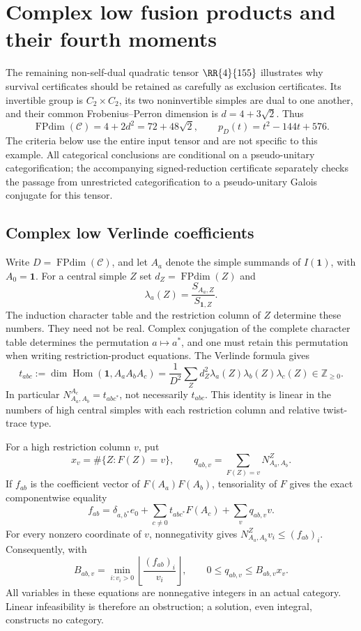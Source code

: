 \section{Complex low fusion products and their fourth moments}
\label{sec:complex-low-fourth}

The remaining non-self-dual quadratic tensor $\RR{4}{155}$ illustrates why
survival certificates should be retained as carefully as exclusion
certificates. Its invertible group is $C_2\times C_2$, its two noninvertible
simples are dual to one another, and their common Frobenius--Perron dimension
is $d=4+3\sqrt2$. Thus
\[
 \operatorname{FPdim}(\mathcal C)=4+2d^2=72+48\sqrt2,
 \qquad p_D(t)=t^2-144t+576.
\]
The criteria below use the entire input tensor and are not specific to this
example. All categorical conclusions are conditional on a pseudo-unitary
categorification; the accompanying signed-reduction certificate separately
checks the passage from unrestricted categorification to a pseudo-unitary
Galois conjugate for this tensor.

\subsection{Complex low Verlinde coefficients}
Write $D=\operatorname{FPdim}(\mathcal C)$, and let $A_a$ denote the simple
summands of $I(\mathbf1)$, with $A_0=\mathbf1$. For a central simple $Z$ set
$d_Z=\operatorname{FPdim}(Z)$ and
\[
 \lambda_a(Z)=\frac{S_{A_a,Z}}{S_{\mathbf1,Z}}.
\]
The induction character table and the restriction column of $Z$ determine
these numbers. They need not be real. Complex conjugation of the complete
character table determines the permutation $a\mapsto a^*$, and one must
retain this permutation when writing restriction-product equations.
The Verlinde formula gives
\begin{equation}\label{eq:r4-complex-triple}
 t_{abc}:=\dim\operatorname{Hom}(\mathbf1,A_aA_bA_c)
 =\frac1{D^2}\sum_Z
       d_Z^2\lambda_a(Z)\lambda_b(Z)\lambda_c(Z)
 \in\mathbb Z_{\ge0}.
\end{equation}
In particular $N_{A_a,A_b}^{A_c}=t_{ab c^*}$, not necessarily $t_{abc}$.
This identity is linear in the numbers of high central simples with each
restriction column and relative twist-trace type.

For a high restriction column $v$, put
\[
 x_v=\#\{Z:F(Z)=v\},\qquad
 q_{ab,v}=\sum_{F(Z)=v}N_{A_a,A_b}^Z.
\]
If $f_{ab}$ is the coefficient vector of $F(A_a)F(A_b)$, tensoriality of $F$
gives the exact componentwise equality
\begin{equation}\label{eq:r4-complex-restriction}
 f_{ab}=\delta_{a,b^*}e_0+
          \sum_{c\ne0}t_{ab c^*}F(A_c)+\sum_v q_{ab,v}v.
\end{equation}
For every nonzero coordinate of $v$, nonnegativity gives
$N_{A_a,A_b}^Z v_i\le(f_{ab})_i$. Consequently, with
\[
 B_{ab,v}=\min_{i:v_i>0}\left\lfloor\frac{(f_{ab})_i}{v_i}\right\rfloor,
 \qquad 0\le q_{ab,v}\le B_{ab,v}x_v.
\]
All variables in these equations are nonnegative integers in an actual
category. Linear infeasibility is therefore an obstruction; a solution,
even integral, constructs no category.

